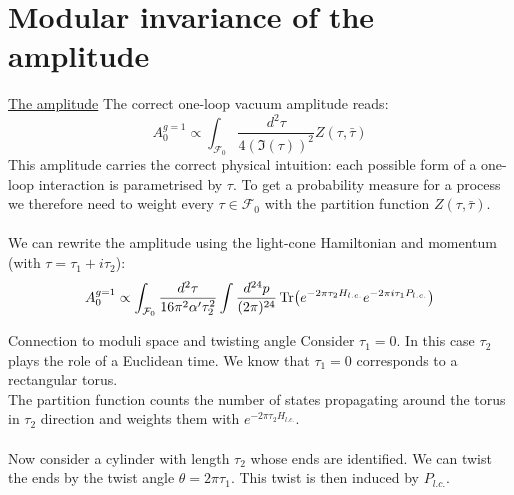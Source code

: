 \documentclass[11pt,aspectratio=169]{beamer}
\begin{document}




\section{Modular invariance of the amplitude}

\begin{frame}{\underline{The amplitude}}
	The correct one-loop vacuum amplitude reads:
	\begin{equation}
		A_0^{g=1} \propto \int_{\mathcal{F}_0}\frac{d^2\tau}{4(\Im(\tau))^2}Z(\tau, \bar{\tau})
	\end{equation}
	This amplitude carries the correct physical intuition: each possible form of a one-loop interaction is parametrised by $\tau$.
	To get a probability measure for a process we therefore need to weight every $\tau \in \mathcal{F}_0$ with the partition function $Z(\tau, \bar{\tau})$.
	\\~\\
	We can rewrite the amplitude using the light-cone Hamiltonian and momentum (with $\tau = \tau_1 + i\tau_2$):
	\begin{equation}
		A_0^{g=1} \propto \int_{\mathcal{F}_0} \frac{d^2\tau}{16\pi^2\alpha'\tau_2^2} \int \frac{d^{24}p}{(2\pi)^{24}}\Tr(e^{-2\pi \tau_2 H_{l.c.}}e^{-2\pi i \tau_1 P_{l.c.}})
	\end{equation}
\end{frame}

\begin{frame}
	
	\begin{block}{Connection to moduli space and twisting angle}
		Consider $\tau_1 = 0$. In this case $\tau_2$ plays the role of a Euclidean time. We know that $\tau_1 = 0$ corresponds to a rectangular torus.
	\\
	The partition function counts the number of states propagating around the torus in $\tau_2$ direction and weights them with $e^{-2\pi\tau_2H_{l.c.}}$.
	\\~\\
	Now consider a cylinder with length $\tau_2$ whose ends are identified. We can twist the ends by the twist angle $\theta = 2\pi \tau_1$. This twist is then induced by $P_{l.c.}$.
	\end{block}
	
\end{frame}
\end{document}
